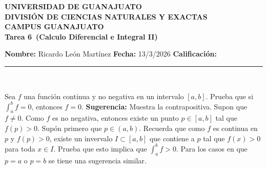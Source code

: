 \documentclass[12pt,a4paper]{article}
\newcommand{\alumno}{Ricardo León Martínez}
\newcommand{\materia}{Calculo Diferencial e Integral II}
\newcommand{\tarea}{Tarea 6}
\newcommand{\fecha}{13/3/2026}
\begin{document}
    \begin{center}
    {\large\textbf{UNIVERSIDAD DE GUANAJUATO}}\\[0.3cm]
    {\normalsize\textbf{DIVISIÓN DE CIENCIAS NATURALES Y EXACTAS}}\\
    {\normalsize\textbf{CAMPUS GUANAJUATO}}\\[1cm]

    {\Large\textbf{\tarea\ (\materia)}}\\[1cm]
    \end{center}

    \textbf{Nombre:} \alumno \hfill 
    \textbf{Fecha:} \fecha \hfill 
    \textbf{Calificación:} \rule{3cm}{0.4pt} \\[0.3cm]

    \begin{mdframed}[style=mdbluebox,frametitle={Ejercicio 1}]
        Sea $f$ una función continua y no negativa en un intervalo $[a,b]$. Prueba que
        si $\int_{a}^{b}f=0$, entonces $f=0$. \textbf{Sugerencia:} Muestra la contrapositiva.
        Supon que $f\neq0$. Como $f$ es no negativa, entonces existe un punto $p\in[a,b]$ tal
        que $f(p)\gt0$. Supón primero que $p\in(a,b)$. Recuerda que como $f$ es continua en $p$
        y $f(p)\gt0$, existe un invervalo $I\subset[a,b]$ que contiene a $p$ tal que $f(x)\gt0$
        para toda $x\in I$. Prueba que esto implica que $\int_{a}^{b}f\gt0$. Para los casos en que
        $p=a$ o $p=b$ se tiene una sugerencia similar.
    \end{mdframed}
\end{document}
